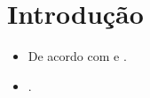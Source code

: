 \chapter{Introdução}

\begin{itemize}
	\item De acordo com  e .
	\item \lipsum[1] \cite{VonBlanckenburg2012a, Lantz2013}.
\end{itemize}
